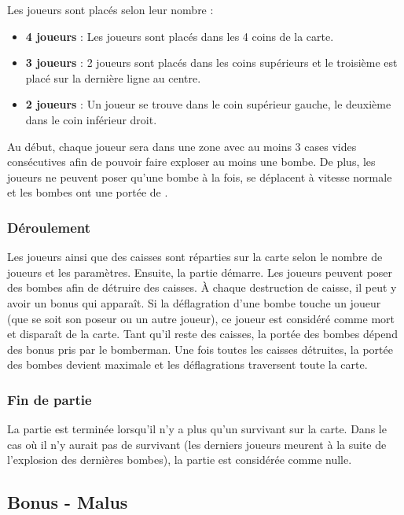 Les joueurs sont placés selon leur nombre : 
\begin{itemize}
\item \textbf{4 joueurs} : Les joueurs sont placés dans les 4 coins de la carte.
\item \textbf{3 joueurs} : 2 joueurs sont placés dans les coins supérieurs et le troisième est placé sur la dernière ligne au centre.
\item \textbf{2 joueurs} : Un joueur se trouve dans le coin supérieur gauche, le deuxième dans le coin inférieur droit.
\end{itemize}

Au début, chaque joueur sera dans une zone avec au moins 3 cases vides consécutives afin de pouvoir faire exploser au moins une bombe. De plus, les joueurs ne peuvent poser qu'une bombe à la fois, se déplacent à vitesse normale et les bombes ont une portée de \porteeParDefaut .

\subsubsection{Déroulement}

Les joueurs ainsi que des caisses sont réparties sur la carte selon le nombre de joueurs et les paramètres. Ensuite, la partie démarre. Les joueurs peuvent poser des bombes afin de détruire des caisses. À chaque destruction de caisse, il peut y avoir un bonus qui apparaît. Si la déflagration d'une bombe touche un joueur (que se soit son poseur ou un autre joueur), ce joueur est considéré comme mort et disparaît de la carte. Tant qu'il reste des caisses, la portée des bombes dépend des bonus pris par le bomberman. Une fois toutes les caisses détruites, la portée des bombes devient maximale et les déflagrations traversent toute la carte.

\subsubsection{Fin de partie}

La partie est terminée lorsqu'il n'y a plus qu'un survivant sur la carte. Dans le cas où il n'y aurait pas de survivant (les derniers joueurs meurent à la suite de l'explosion des dernières bombes), la partie est considérée comme nulle.

\subsection{Bonus - Malus}

